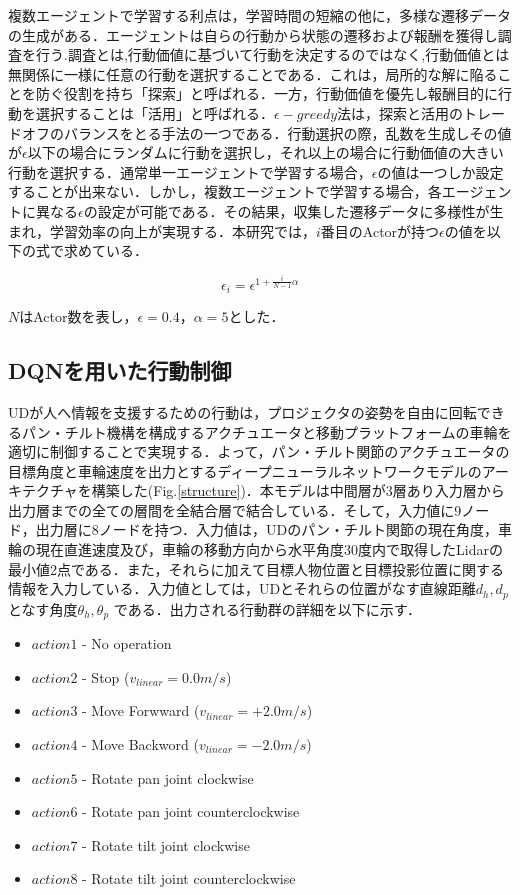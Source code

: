 \documentclass[12pt]{sonota/aislab}
\begin{document}
複数エージェントで学習する利点は，学習時間の短縮の他に，多様な遷移データの生成がある．エージェントは自らの行動から状態の遷移および報酬を獲得し調査を行う.調査とは,行動価値に基づいて行動を決定するのではなく,行動価値とは無関係に一様に任意の行動を選択することである．これは，局所的な解に陥ることを防ぐ役割を持ち「探索」と呼ばれる．一方，行動価値を優先し報酬目的に行動を選択することは「活用」と呼ばれる．$\epsilon-greedy$法は，探索と活用のトレードオフのバランスをとる手法の一つである．行動選択の際，乱数を生成しその値が$\epsilon$以下の場合にランダムに行動を選択し，それ以上の場合に行動価値の大きい行動を選択する．通常単一エージェントで学習する場合，$\epsilon$の値は一つしか設定することが出来ない．しかし，複数エージェントで学習する場合，各エージェントに異なる$\epsilon$の設定が可能である．その結果，収集した遷移データに多様性が生まれ，学習効率の向上が実現する．本研究では，$i$番目のActorが持つ$\epsilon$の値を以下の式で求めている．

\begin{equation}
\label{sum_P_i}
  \epsilon_{i}=\epsilon^{1+\frac{i}{N-1}\alpha}
\end{equation}

$N$はActor数を表し，$\epsilon=0.4$，$\alpha=5$とした．

\subsection{DQNを用いた行動制御}
UDが人へ情報を支援するための行動は，プロジェクタの姿勢を自由に回転できるパン・チルト機構を構成するアクチュエータと移動プラットフォームの車輪を適切に制御することで実現する．よって，パン・チルト関節のアクチュエータの目標角度と車輪速度を出力とするディープニューラルネットワークモデルのアーキテクチャを構築した(Fig.\ref{structure})．本モデルは中間層が3層あり入力層から出力層までの全ての層間を全結合層で結合している．そして，入力値に9ノード，出力層に8ノードを持つ．入力値は，UDのパン・チルト関節の現在角度，車輪の現在直進速度及び，車輪の移動方向から水平角度30度内で取得したLidarの最小値2点である．また，それらに加えて目標人物位置と目標投影位置に関する情報を入力している．入力値としては，UDとそれらの位置がなす直線距離$d_{h},d_{p}$となす角度$\theta_{h},\theta_{p}$
である．出力される行動群の詳細を以下に示す．

\begin{itemize}
    \item $action1$ - No operation 
    \item $action2$ - Stop ($v_{linear} = 0.0 m/s$)
    \item $action3$ - Move Forwward ($v_{linear} = +2.0 m/s$)
    \item $action4$ - Move Backword ($v_{linear} = -2.0 m/s$)
    \item $action5$ - Rotate pan joint clockwise
    \item $action6$ - Rotate pan joint counterclockwise
    \item $action7$ - Rotate tilt joint clockwise 
    \item $action8$ - Rotate tilt joint counterclockwise
\end{itemize}
\end{document}
